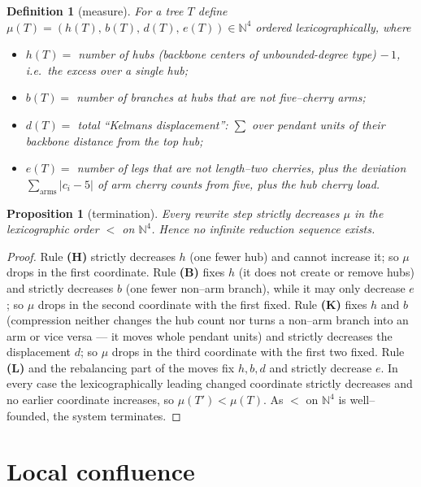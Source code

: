 \documentclass[11pt]{article}
\newtheorem{proposition}[theorem]{Proposition}
\newtheorem{definition}[theorem]{Definition}
\begin{document}
\begin{definition}[measure]\label{def:measure}
For a tree $T$ define $\mu(T)=(h(T),\,b(T),\,d(T),\,e(T))\in\mathbb{N}^4$ ordered lexicographically, where
\begin{itemize}
\item $h(T)=$ number of hubs (backbone centers of unbounded-degree type) $-\,1$, i.e.\ the excess over a single hub;
\item $b(T)=$ number of branches at hubs that are \emph{not} five--cherry arms;
\item $d(T)=$ total ``Kelmans displacement'': $\sum$ over pendant units of their backbone distance from the top hub;
\item $e(T)=$ number of legs that are not length--two cherries, plus the deviation $\sum_{\text{arms}}|c_i-5|$
of arm cherry counts from five, plus the hub cherry load.
\end{itemize}
\end{definition}

\begin{proposition}[termination]\label{prop:term}
Every rewrite step strictly decreases $\mu$ in the lexicographic order $<$ on $\mathbb{N}^4$. Hence no
infinite reduction sequence exists.
\end{proposition}

\begin{proof}
Rule \textbf{(H)} strictly decreases $h$ (one fewer hub) and cannot increase it; so $\mu$ drops in the first
coordinate. Rule \textbf{(B)} fixes $h$ (it does not create or remove hubs) and strictly decreases $b$ (one
fewer non--arm branch), while it may only decrease $e$; so $\mu$ drops in the second coordinate with the first
fixed. Rule \textbf{(K)} fixes $h$ and $b$ (compression neither changes the hub count nor turns a non--arm
branch into an arm or vice versa --- it moves whole pendant units) and strictly decreases the displacement
$d$; so $\mu$ drops in the third coordinate with the first two fixed. Rule \textbf{(L)} and the rebalancing
part of the moves fix $h,b,d$ and strictly decrease $e$. In every case the lexicographically leading changed
coordinate strictly decreases and no earlier coordinate increases, so $\mu(T')<\mu(T)$. As $<$ on
$\mathbb{N}^4$ is well--founded, the system terminates.
\end{proof}

\section{Local confluence}
\end{document}
